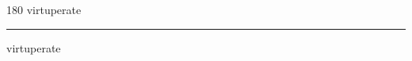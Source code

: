 
\begin{frame}
\begin{center}
\begin{turn}{180}
{\fontsize{2.5cm}{1em}\selectfont virtuperate}
\end{turn}
\vspace{1em}\par  
\hrule
\vspace{1em}\par  
{\fontsize{2.5cm}{1em}\selectfont virtuperate}
\end{center}
\end{frame}
